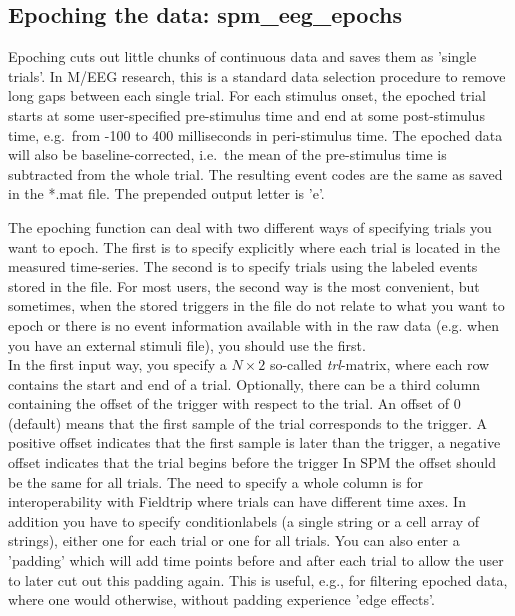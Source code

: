 \subsection{Epoching the data: spm\_eeg\_epochs}
Epoching cuts out little chunks of continuous data and saves them as
'single trials'. In M/EEG research, this is a standard data selection
procedure to remove long gaps between each single trial. For each
stimulus onset, the epoched trial starts at some user-specified
pre-stimulus time and 
end at some post-stimulus time, e.g.~from -100 to 400 milliseconds in
peri-stimulus time. The epoched data will also be baseline-corrected,
i.e.~the mean of the pre-stimulus time is subtracted from the whole
trial. The resulting event codes are the same as saved in the *.mat
file. The prepended output letter is 'e'.

The epoching function can deal with two different ways of specifying trials 
you want to epoch. The first is to specify explicitly where each trial is located 
in the measured time-series. The second is to specify trials using the labeled events
stored in the file. For most users, the second way is the most convenient, but sometimes, when
the stored triggers in the file do not relate to what you want to epoch or there is no event
information available with in the raw data (e.g. when you have an external stimuli file),
you should use the first. 
\\
In the first input way, you specify a $N \times 2$ so-called \textit{trl}-matrix, where
each row contains the start and end of a trial. Optionally, there can be a third column 
containing the offset of the trigger with respect to the trial. An offset of 0 (default)
means that the first sample of the trial corresponds to the trigger. A positive offset indicates
that the first sample is later than the trigger, a negative offset indicates that the trial begins before the trigger
In SPM the offset should be the same for all trials. The need to specify a whole column is for interoperability
with Fieldtrip where trials can have different time axes. In addition you have to specify conditionlabels (a single string or a cell array
of strings), either one for each trial or one for all trials. You can also enter a 'padding' which will add time points before and after each 
trial to allow the user to later cut out this padding again. This is useful, e.g., for filtering epoched
data, where one would otherwise, without padding experience 'edge effects'. 

